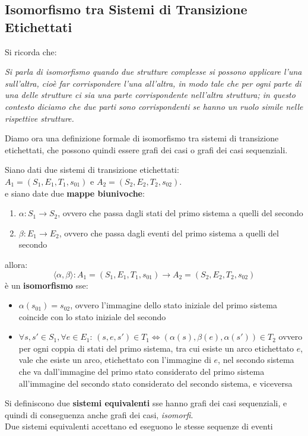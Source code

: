 \documentclass[a4paper,12pt, oneside]{book}
\begin{document}
\subsection{Isomorfismo tra Sistemi di Transizione Etichettati}
Si ricorda che:
\begin{center}
  \textit{Si parla di isomorfismo quando due strutture complesse si possono
    applicare l'una sull'altra, cioè far corrispondere l'una all'altra, in modo
    tale che per ogni parte di una delle strutture ci sia una parte
    corrispondente nell'altra struttura; in questo contesto diciamo che due
    parti sono corrispondenti se hanno un ruolo simile nelle rispettive
    strutture.}
\end{center}
Diamo ora una definizione formale di isomorfismo tra sistemi di transizione
etichettati, che possono quindi essere grafi dei casi o grafi dei casi
sequenziali.
\begin{definizione}
  Siano dati due sistemi di transizione etichettati:\\
  $A_1 = (S_1,E_1,T_1,s_{01})$ e $A_2 = (S_2 , E_2 , T_2 , s_{02})$.\\
  e siano date due \textbf{mappe biunivoche}:
  \begin{enumerate}
    \item $\alpha:S_1\to S_2$, ovvero che passa dagli stati del primo sistema a
    quelli del secondo
    \item $\beta:E_1\to E_2$, ovvero che passa dagli eventi del primo sistema a
    quelli del secondo
  \end{enumerate}
  allora:
  \[\langle \alpha,\beta\rangle:A_1= (S_1 , E_1 , T_1 ,s_{01})\to A_2 = (S_2 ,
    E_2 , T_2 , s_{02})\]
  è un \textbf{isomorfismo} sse:
  \begin{itemize}
    \item $\alpha(s_{01})=s_{02}$, ovvero l'immagine dello stato iniziale del
    primo sistema coincide con lo stato iniziale del secondo
    \item $\forall s,s'\in S_1,\forall e\in E_1:\,(s,e,s')\in T_1
    \Leftrightarrow (\alpha(s),\beta(e),\alpha(s'))\in T_2$ ovvero per ogni
    coppia di stati del primo sistema, tra cui esiste un arco etichettato $e$,
    vale che esiste un arco, etichettato con l'immagine di $e$, nel secondo
    sistema che va dall'immagine del primo stato considerato del primo sistema
    all'immagine del secondo stato considerato del secondo sistema, e viceversa
  \end{itemize}
\end{definizione}
\begin{definizione}
  Si definiscono due \textbf{sistemi equivalenti} sse hanno grafi dei casi
  sequenziali, e quindi di conseguenza anche grafi dei casi, \emph{isomorfi}.\\
  Due sistemi equivalenti accettano ed eseguono le stesse sequenze di eventi
\end{definizione}
\end{document}
